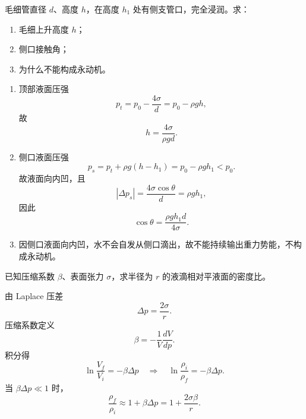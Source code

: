 \begin{question}
毛细管直径 $d$、高度 $h$，在高度 $h_1$ 处有侧支管口，完全浸润。求：
\begin{enumerate}[label=(\arabic*),leftmargin=2.8em,itemsep=0.2em]
\item 毛细上升高度 $h$；
\item 侧口接触角；
\item 为什么不能构成永动机。
\end{enumerate}
\begin{solution}
\begin{enumerate}[label=(\arabic*),leftmargin=2.8em,itemsep=0.2em]
\item 顶部液面压强
\[
p_t=p_0-\frac{4\sigma}{d}=p_0-\rho gh,
\]
故
\[
h=\frac{4\sigma}{\rho gd}.
\]
\item 侧口液面压强
\[
p_s=p_t+\rho g(h-h_1)=p_0-\rho gh_1<p_0.
\]
故液面向内凹，且
\[
\left|\Delta p_s\right|=\frac{4\sigma\cos\theta}{d}=\rho gh_1,
\]
因此
\[
\cos\theta=\frac{\rho gh_1d}{4\sigma}.
\]
\item 因侧口液面向内凹，水不会自发从侧口滴出，故不能持续输出重力势能，不构成永动机。
\end{enumerate}

\end{solution}
\end{question}

\begin{question}
已知压缩系数 $\beta$、表面张力 $\sigma$，求半径为 $r$ 的液滴相对平液面的密度比。
\begin{solution}
由 Laplace 压差
\[
\Delta p=\frac{2\sigma}{r}.
\]
压缩系数定义
\[
\beta=-\frac1V\frac{dV}{dp}.
\]
积分得
\[
\ln\frac{V_f}{V_i}=-\beta\Delta p
\quad\Rightarrow\quad
\ln\frac{\rho_i}{\rho_f}=-\beta\Delta p.
\]
当 $\beta\Delta p\ll1$ 时，
\[
\frac{\rho_f}{\rho_i}\approx 1+\beta\Delta p
=1+\frac{2\sigma\beta}{r}.
\]
\end{solution}
\end{question}


